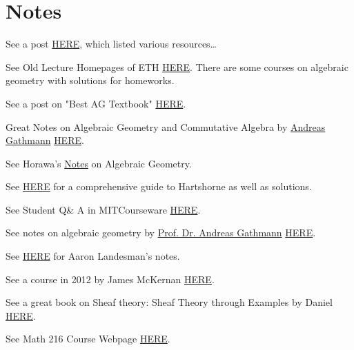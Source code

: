 \section{Notes}

See a post \href{https://math.stackexchange.com/questions/1678780/hartshorne-or-vakils-notes}{HERE}, which listed various resources\dots

See Old Lecture Homepages of ETH \href{https://www2.math.ethz.ch/education/bachelor/lectures.html}{HERE}. There are some courses on algebraic geometry with solutions for homeworks.

See a post on "Best AG Textbook" \href{https://math.stackexchange.com/questions/998/best-algebraic-geometry-text-book-other-than-hartshorne#:~:text=Before%20Hartshorne%27s%20book%20there%20was,and%20the%20sheaf%20of%20differentials.}{HERE}.

Great Notes on Algebraic Geometry and Commutative Algebra by \href{https://math.rptu.de/ags/agag/personen/leitung/gathmann/}{Andreas Gathmann} \href{https://agag-gathmann.math.rptu.de/de/notes.php}{HERE}.

See Horawa's \href{https://people.maths.ox.ac.uk/horawa/notes.html}{Notes} on Algebraic Geometry.

See \href{https://mathbooknotes.fandom.com/wiki/Hartshorne_-_Algebraic_Geometry}{HERE} for a comprehensive guide to Hartshorne as well as solutions.

See Student Q\& A in MITCourseware \href{https://ocw.mit.edu/courses/18-726-algebraic-geometry-spring-2009/pages/student-q-a/}{HERE}.

See notes on algebraic geometry by \href{https://math.rptu.de/en/wgs/agag/people/head/gathmann/}{Prof. Dr. Andreas Gathmann} \href{https://agag-gathmann.math.rptu.de/en/alggeom.php}{HERE}.


See \href{https://people.math.harvard.edu/~landesman/notes.html}{HERE} for Aaron Landesman's notes.

See a course in 2012 by James McKernan \href{https://math.mit.edu/~mckernan/Teaching/11-12/Spring/18.726/18.726.html}{HERE}.

See a great book on Sheaf theory: Sheaf Theory through Examples by Daniel \href{https://direct.mit.edu/books/oa-monograph/5460/Sheaf-Theory-through-Examples#}{HERE}.

See Math 216 Course Webpage \href{https://math216.wordpress.com}{HERE}.